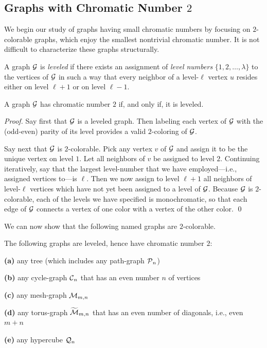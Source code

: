 \subsection{Graphs with Chromatic Number $2$}
\label{sec:2-color-graphs}

We begin our study of graphs having small chromatic numbers by focusing on $2$-colorable graphs, which enjoy the smallest nontrivial chromatic number.  It is not difficult to characterize these graphs structurally.

A graph $\mbox{$\cal G$}$ is {\it leveled} if there exists an assignment of {\it level numbers} $\{ 1, 2, \ldots, \lambda\}$ to the vertices of $\mbox{$\cal G$}$ in such a way that every neighbor of a level-$\ell$ vertex $u$ resides either on level $\ell +1$ or on level $\ell -1$.

\begin{prop}
\label{thm:leveled=2-color}
A graph $\mbox{$\cal G$}$ has chromatic number $2$ if, and only if, it is leveled.
\end{prop}

\begin{proof}
Say first that $\mbox{$\cal G$}$ is a leveled graph.  Then labeling each vertex of $\mbox{$\cal G$}$ with the (odd-even) parity of its level provides a valid $2$-coloring of $\mbox{$\cal G$}$.

Say next that $\mbox{$\cal G$}$ is $2$-colorable.  Pick any vertex $v$ of $\mbox{$\cal G$}$ and assign it to be the unique vertex on level $1$.  Let all neighbors of $v$ be assigned to level $2$.  Continuing iteratively, say that the largest level-number that we have employed---i.e., assigned vertices to---is $\ell$.  Then we now assign to level $\ell +1$ all neighbors of level-$\ell$ vertices which have not yet been assigned to a level of $\mbox{$\cal G$}$.  Because $\mbox{$\cal G$}$ is $2$-colorable, each of the levels we have specified is monochromatic, so that each edge of $\mbox{$\cal G$}$ connects a vertex of one color with a vertex of the other color.  \qed
\end{proof}

We can now show that the following named graphs are $2$-colorable.

\begin{corol}
\label{thm:list-2-colorables}
The following graphs are leveled, hence have chromatic number $2$:

{\bf (a)}
any tree (which includes any path-graph $\mbox{$\cal P$}_n$)

{\bf (b)}
any cycle-graph $\mbox{$\cal C$}_n$ that has an even number $n$ of vertices

{\bf (c)}
any mesh-graph $\mbox{$\cal M$}_{m,n}$

{\bf (d)}
any torus-graph $\widetilde{\mbox{$\cal M$}}_{m,n}$ that has an even number of
diagonals, i.e., even $m+n$

{\bf (e)}
any hypercube $\mbox{$\cal Q$}_n$
\end{corol}

